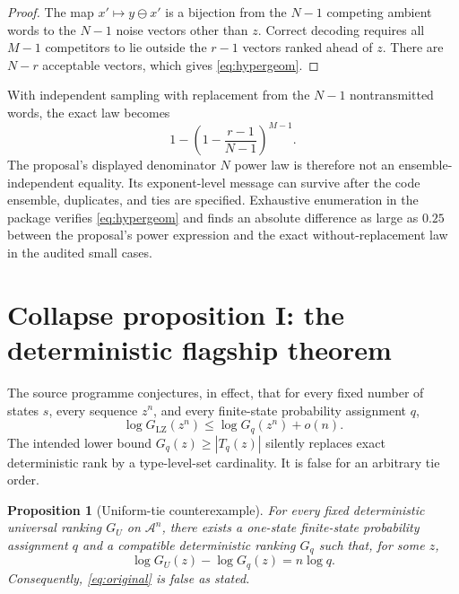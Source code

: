 \documentclass[11pt]{article}
\newtheorem{proposition}{Proposition}
\newcommand{\A}{\mathcal A}
\begin{document}
\begin{proof}
The map $x'\mapsto y\ominus x'$ is a bijection from the $N-1$ competing ambient words to the $N-1$ noise vectors other than $z$.  Correct decoding requires all $M-1$ competitors to lie outside the $r-1$ vectors ranked ahead of $z$.  There are $N-r$ acceptable vectors, which gives \eqref{eq:hypergeom}.
\end{proof}

With independent sampling with replacement from the $N-1$ nontransmitted words, the exact law becomes
\begin{equation}
 1-\left(1-\frac{r-1}{N-1}\right)^{M-1}.
 \label{eq:replacement}
\end{equation}
The proposal's displayed denominator $N$ power law is therefore not an ensemble-independent equality.  Its exponent-level message can survive after the code ensemble, duplicates, and ties are specified.  Exhaustive enumeration in the package verifies \eqref{eq:hypergeom} and finds an absolute difference as large as $0.25$ between the proposal's power expression and the exact without-replacement law in the audited small cases.

\section{Collapse proposition I: the deterministic flagship theorem}

The source programme conjectures, in effect, that for every fixed number of states $s$, every sequence $z^n$, and every finite-state probability assignment $q$,
\begin{equation}
 \log G_{\mathrm{LZ}}(z^n)
 \le \log G_q(z^n)+o(n).
 \label{eq:original}
\end{equation}
The intended lower bound $G_q(z)\ge |T_q(z)|$ silently replaces exact deterministic rank by a type-level-set cardinality.  It is false for an arbitrary tie order.

\begin{proposition}[Uniform-tie counterexample]
For every fixed deterministic universal ranking $G_U$ on $\A^n$, there exists a one-state finite-state probability assignment $q$ and a compatible deterministic ranking $G_q$ such that, for some $z$, 
\begin{equation}
 \log G_U(z)-\log G_q(z)=n\log q.
\end{equation}
Consequently, \eqref{eq:original} is false as stated.
\end{proposition}
\end{document}
